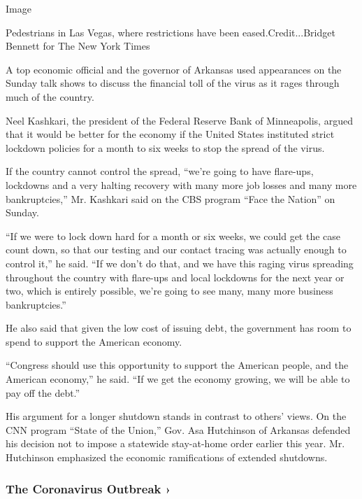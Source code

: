 Image

Pedestrians in Las Vegas, where restrictions have been
eased.Credit...Bridget Bennett for The New York Times

A top economic official and the governor of Arkansas used appearances on
the Sunday talk shows to discuss the financial toll of the virus as it
rages through much of the country.

Neel Kashkari, the president of the Federal Reserve Bank of Minneapolis,
argued that it would be better for the economy if the United States
instituted strict lockdown policies for a month to six weeks to stop the
spread of the virus.

If the country cannot control the spread, ``we're going to have
flare-ups, lockdowns and a very halting recovery with many more job
losses and many more bankruptcies,'' Mr. Kashkari said on the CBS
program ``Face the Nation'' on Sunday.

``If we were to lock down hard for a month or six weeks, we could get
the case count down, so that our testing and our contact tracing was
actually enough to control it,'' he said. ``If we don't do that, and we
have this raging virus spreading throughout the country with flare-ups
and local lockdowns for the next year or two, which is entirely
possible, we're going to see many, many more business bankruptcies.''

He also said that given the low cost of issuing debt, the government has
room to spend to support the American economy.

``Congress should use this opportunity to support the American people,
and the American economy,'' he said. ``If we get the economy growing, we
will be able to pay off the debt.''

His argument for a longer shutdown stands in contrast to others' views.
On the CNN program ``State of the Union,'' Gov. Asa Hutchinson of
Arkansas defended his decision not to impose a statewide stay-at-home
order earlier this year. Mr. Hutchinson emphasized the economic
ramifications of extended shutdowns.

\href{https://www.nytimes.com/news-event/coronavirus?action=click\&pgtype=Article\&state=default\&region=MAIN_CONTENT_3\&context=storylines_faq}{}

\hypertarget{the-coronavirus-outbreak-}{%
\subsubsection{The Coronavirus Outbreak
›}\label{the-coronavirus-outbreak-}}

